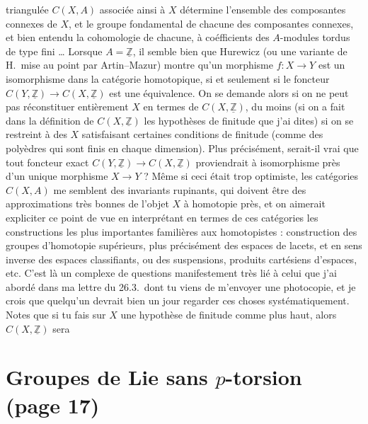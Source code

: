 \documentclass[11pt,a4paper]{article}
\begin{document}
triangulée $C(X,A)$ associée ainsi à $X$ détermine l'ensemble des
composantes connexes de $X$, et le groupe fondamental de chacune des
composantes connexes, et bien entendu la cohomologie de chacune, à
coéfficients des $A$-modules tordus de type fini \ldots{} Lorsque
$A = \underline{\mathbb{Z}}$, il semble bien que Hurewicz (ou une variante de
H.\ mise au point par Artin--Mazur) montre qu'un morphisme $f : X \to Y$ est
un isomorphisme dans la catégorie homotopique, si et seulement si le
foncteur $C(Y,\underline{\mathbb{Z}}) \to C(X,\underline{\mathbb{Z}})$ est
une équivalence. On se demande alors si on ne peut pas réconstituer
entièrement $X$ en termes de $C(X,\underline{\mathbb{Z}})$, du moins (si on a
fait dans la définition de $C(X,\underline{\mathbb{Z}})$ les hypothèses de
finitude que j'ai dites) si on se restreint à des $X$ satisfaisant certaines
conditions de finitude (comme des polyèdres qui sont finis en chaque
dimension). Plus précisément, serait-il vrai que tout foncteur exact
$C(Y,\underline{\mathbb{Z}}) \to C(X,\underline{\mathbb{Z}})$ proviendrait à
isomorphisme près d'un unique morphisme $X \to Y$ ? Même si ceci était trop
optimiste, les catégories $C(X,A)$ me semblent des invariants rupinants, qui
doivent être des approximations très bonnes de l'objet $X$ à homotopie près,
et on aimerait expliciter ce point de vue en 
interprétant en  termes de ces catégories les constructions
les plus importantes familières aux homotopistes : construction des groupes
d'homotopie supérieurs, plus  précisément des espaces
de lacets, et en sens inverse des espaces classifiants, ou des suspensions,
produits cartésiens d'espaces,  etc.  C'est là un complexe
de questions manifestement très lié à celui que j'ai abordé dans ma lettre
du 26.3.\ dont tu viens de m'envoyer une photocopie, et je crois que
quelqu'un devrait bien un jour regarder ces choses systématiquement. Notes
que si tu fais sur $X$ une hypothèse de finitude comme plus haut, alors
$C(X,\underline{\mathbb{Z}})$ sera

\section*{Groupes de Lie sans $p$-torsion (page 17)}
\end{document}
